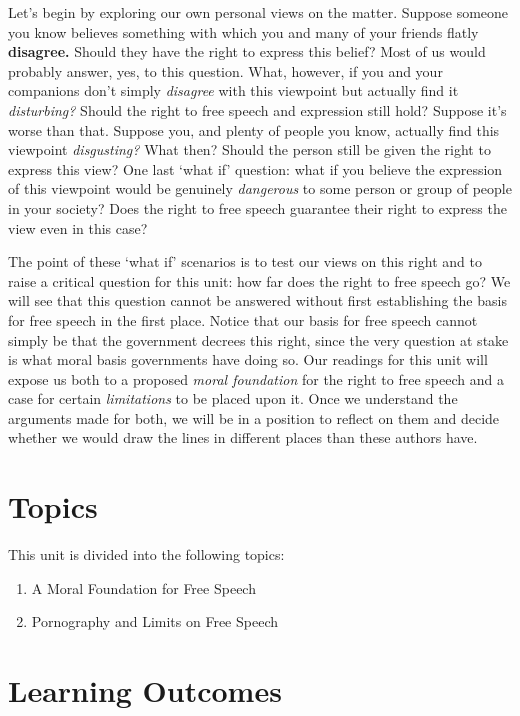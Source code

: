 \documentclass[
]{book}
\providecommand{\tightlist}{%
  \setlength{\itemsep}{0pt}\setlength{\parskip}{0pt}}
\begin{document}
Let's begin by exploring our own personal views on the matter. Suppose someone you know believes something with which you and many of your friends flatly \textbf{disagree.} Should they have the right to express this belief? Most of us would probably answer, yes, to this question. What, however, if you and your companions don't simply \emph{disagree} with this viewpoint but actually find it \emph{disturbing?} Should the right to free speech and expression still hold? Suppose it's worse than that. Suppose you, and plenty of people you know, actually find this viewpoint \emph{disgusting?} What then? Should the person still be given the right to express this view? One last `what if' question: what if you believe the expression of this viewpoint would be genuinely \emph{dangerous} to some person or group of people in your society? Does the right to free speech guarantee their right to express the view even in this case?

The point of these `what if' scenarios is to test our views on this right and to raise a critical question for this unit: how far does the right to free speech go? We will see that this question cannot be answered without first establishing the basis for free speech in the first place. Notice that our basis for free speech cannot simply be that the government decrees this right, since the very question at stake is what moral basis governments have doing so. Our readings for this unit will expose us both to a proposed \emph{moral foundation} for the right to free speech and a case for certain \emph{limitations} to be placed upon it. Once we understand the arguments made for both, we will be in a position to reflect on them and decide whether we would draw the lines in different places than these authors have.

\hypertarget{topics-2}{%
\section*{Topics}\label{topics-2}}

This unit is divided into the following topics:

\begin{enumerate}
\def\labelenumi{\arabic{enumi}.}
\tightlist
\item
  A Moral Foundation for Free Speech
\item
  Pornography and Limits on Free Speech
\end{enumerate}

\hypertarget{learning-outcomes-2}{%
\section*{Learning Outcomes}\label{learning-outcomes-2}}
\end{document}
